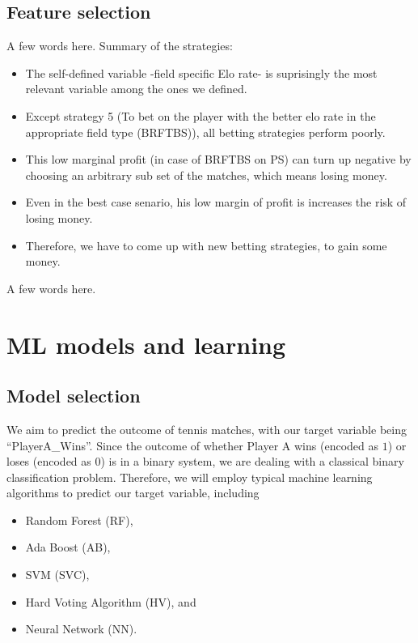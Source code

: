 \documentclass[preprint,aps,nofootinbib,a4paper,superscriptaddress,longbibliography,amsfonts,amssymb,amsmath,titlepage]{revtex4-2}
\begin{document}
\subsection{Feature selection}

A few words here.
Summary of the strategies:
%
\begin{itemize}
\item The self-defined variable -field specific Elo rate- is suprisingly the most relevant variable among the ones we defined.
\item Except strategy 5 (To bet on the player with the better elo rate in the appropriate field type (BRFTBS)), all betting strategies perform poorly.
\item This low marginal profit (in case of BRFTBS on PS) can turn up negative by choosing an arbitrary sub set of the matches, which means losing money.
\item Even in the best case senario, his low margin of profit is increases the risk of losing money.
\item Therefore, we have to come up with new betting strategies, to gain some money.
\end{itemize}
%
A few words here.

\section{ML models and learning}

\subsection{Model selection}

We aim to predict the outcome of tennis matches, with our target variable being ``PlayerA\_Wins''. Since the outcome of whether Player A wins (encoded as $1$) or loses (encoded as $0$) is in a binary system, we are dealing with a classical binary classification problem. Therefore, we will employ typical machine learning algorithms to predict our target variable, including
%
\begin{itemize}
\item Random Forest (RF),
\item Ada Boost (AB),
\item SVM (SVC),
\item Hard Voting Algorithm (HV), and
\item Neural Network (NN).
\end{itemize}
\end{document}
